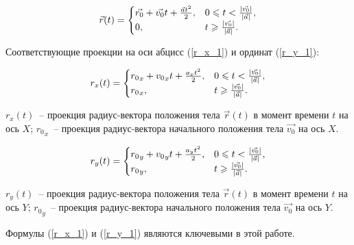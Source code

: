 \begin{equation}\label{r_system_1}
  \vec{r}(t) = \begin{cases}
    \vec{r_0} + \vec{v_0}t + \frac{\vec{a}t^2}{2}, & 0 \leqslant t < \frac{\left|\vec{v_0}\right|}{\left|\vec{a}\right|}, \\
    0,                                             & t \geqslant \frac{\left|\vec{v_0}\right|}{\left|\vec{a}\right|} .
  \end{cases}
\end{equation}

Соответствующие проекции на оси абцисс (\ref{r_x_1}) и ординат (\ref{r_y_1}):

\begin{equation}\label{r_x_1}
  r_x(t) =
  \begin{cases}
    {r_0}_x + {v_0}_x t + \frac{a_x t^2}{2}, & 0 \leqslant t < \frac{\left|\vec{v_0}\right|}{\left|\vec{a}\right|}, \\
    {r_0}_x,               & t \geqslant \frac{\left|\vec{v_0}\right|}{\left|\vec{a}\right|}.
  \end{cases}
\end{equation}
\begin{Underequation}
  \(r_x(t)\)~-- проекция радиус-вектора положения тела \(\vec{r}(t)\) в момент времени \(t\) на ось \(X\); 
  \({r_0}_x\)~-- проекция радиус-вектора начального положения тела \(\vec{v_0}\) на ось \(X\). 
\end{Underequation}

\begin{equation}\label{r_y_1}
  r_y(t) =
  \begin{cases}
    {r_0}_y + {v_0}_y t + \frac{a_y t^2}{2}, & 0 \leqslant t < \frac{\left|\vec{v_0}\right|}{\left|\vec{a}\right|}, \\
    {r_0}_y,               & t \geqslant \frac{\left|\vec{v_0}\right|}{\left|\vec{a}\right|}.
  \end{cases}
\end{equation}
\begin{Underequation}
  \(r_y(t)\)~-- проекция радиус-вектора положения тела \(\vec{r}(t)\) в момент времени \(t\) на ось \(Y\); 
  \({r_0}_y\)~-- проекция радиус-вектора начального положения тела \(\vec{v_0}\) на ось \(Y\). 
\end{Underequation}

Формулы (\ref{r_x_1}) и (\ref{r_y_1}) являются ключевыми в этой работе.
